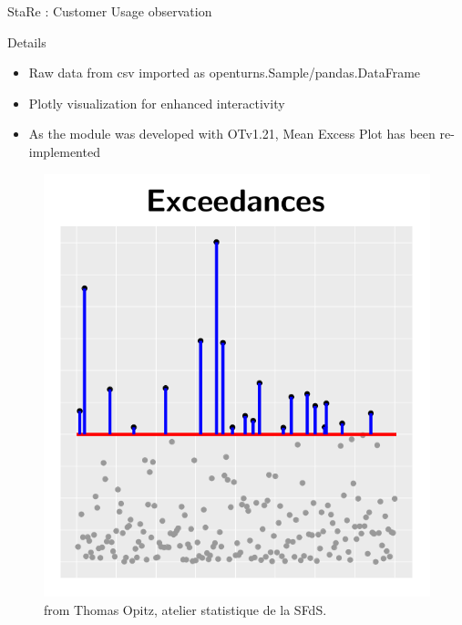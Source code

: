 \documentclass{renault-template}
\begin{document}
\begin{frame}{StaRe : Customer Usage observation}
  \begin{block}{Details}
    \begin{itemize}
    \item Raw data from csv imported as openturns.Sample/pandas.DataFrame
    \item Plotly visualization for enhanced interactivity
    \item As the module was developed with OTv1.21, Mean Excess Plot has been re-implemented
    \end{itemize}
  \end{block}
  \begin{figure}
    \centering
    \includegraphics[height=0.44\textheight]{Illustration_StaRe/exceedances.png}
    \caption{from Thomas Opitz, atelier statistique de la SFdS.}
  \end{figure}
\end{frame}
\end{document}
